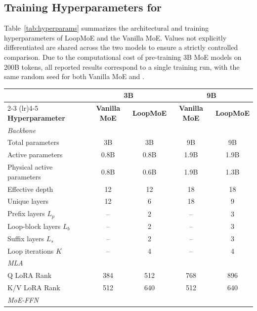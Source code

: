 \subsection{Training Hyperparameters for \ourmodelnospace}
\label{app:hyperparams}
Table~\ref{tab:hyperparams} summarizes the architectural and training hyperparameters of LoopMoE and the Vanilla MoE. Values not explicitly differentiated are shared across the two models to ensure a strictly controlled comparison. Due to the computational cost of pre-training 3B MoE models on 200B tokens, all reported results correspond to a single training run, with the same random seed for both Vanilla MoE and \ourmodelnospace.

\begin{table}[h]
\centering
\small
\setlength{\tabcolsep}{3.5pt}
\renewcommand{\arraystretch}{1.05}
\begin{tabular}{lcccc}
\toprule
& \multicolumn{2}{c}{\textbf{3B}} & \multicolumn{2}{c}{\textbf{9B}} \\
\cmidrule(lr){2-3} \cmidrule(lr){4-5}
\textbf{Hyperparameter} & \textbf{Vanilla MoE} & \textbf{LoopMoE} & \textbf{Vanilla MoE} & \textbf{LoopMoE} \\
\midrule
\multicolumn{5}{l}{\emph{Backbone}} \\
\midrule
Total parameters                 & 3B   & 3B   & 9B   & 9B   \\
Active parameters                & 0.8B & 0.8B & 1.9B& 1.9B\\
Physical active parameters       & 0.8B & 0.6B & 1.9B& 1.3B\\
Effective depth                  & 12   & 12   & 18& 18\\
Unique layers                    & 12   & 6    & 18& 9\\
\quad Prefix layers $L_p$        & --   & 2    & --   & 3\\
\quad Loop-block layers $L_b$    & --   & 2    & --   & 3\\
\quad Suffix layers $L_s$        & --   & 2    & --   & 3\\
Loop iterations $K$              & --   & 4    & --   & 4\\
\midrule
\multicolumn{5}{l}{\emph{MLA}} \\
\midrule
Q LoRA Rank                      & 384  & 512  & 768& 896\\
K/V LoRA Rank                    & 512  & 640  & 512& 640\\
\midrule
\multicolumn{5}{l}{\emph{MoE-FFN}} \\

\end{tabular}
\end{table}
